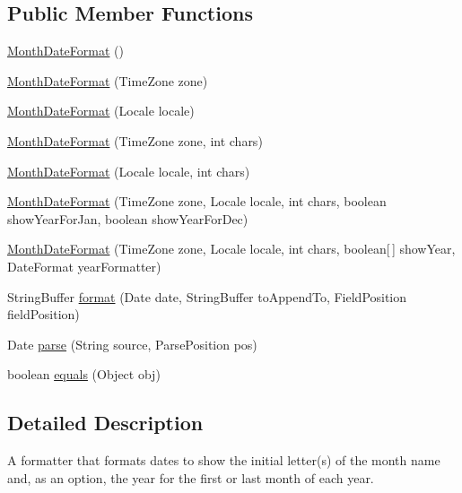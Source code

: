 \subsection*{Public Member Functions}
\begin{DoxyCompactItemize}
\item 
\mbox{\hyperlink{classorg_1_1jfree_1_1chart_1_1axis_1_1_month_date_format_a8b6826e19fa9d3f293747d8e635b74a7}{Month\+Date\+Format}} ()
\item 
\mbox{\hyperlink{classorg_1_1jfree_1_1chart_1_1axis_1_1_month_date_format_a57589918cf5331a7042e1eeefb56ae4a}{Month\+Date\+Format}} (Time\+Zone zone)
\item 
\mbox{\hyperlink{classorg_1_1jfree_1_1chart_1_1axis_1_1_month_date_format_a9046b5f0939b3254cfa15be25836b410}{Month\+Date\+Format}} (Locale locale)
\item 
\mbox{\hyperlink{classorg_1_1jfree_1_1chart_1_1axis_1_1_month_date_format_a949c3a15485bff918c0799a1bd0f540b}{Month\+Date\+Format}} (Time\+Zone zone, int chars)
\item 
\mbox{\hyperlink{classorg_1_1jfree_1_1chart_1_1axis_1_1_month_date_format_a83ee78aaeb24a76793268c5a6142a6d7}{Month\+Date\+Format}} (Locale locale, int chars)
\item 
\mbox{\hyperlink{classorg_1_1jfree_1_1chart_1_1axis_1_1_month_date_format_af58ea4c893ab9d48426c15666c09722d}{Month\+Date\+Format}} (Time\+Zone zone, Locale locale, int chars, boolean show\+Year\+For\+Jan, boolean show\+Year\+For\+Dec)
\item 
\mbox{\hyperlink{classorg_1_1jfree_1_1chart_1_1axis_1_1_month_date_format_a705e877375be07717cdfc22dea225a99}{Month\+Date\+Format}} (Time\+Zone zone, Locale locale, int chars, boolean\mbox{[}$\,$\mbox{]} show\+Year, Date\+Format year\+Formatter)
\item 
String\+Buffer \mbox{\hyperlink{classorg_1_1jfree_1_1chart_1_1axis_1_1_month_date_format_a74197ac0a76d197f26da1414f386260a}{format}} (Date date, String\+Buffer to\+Append\+To, Field\+Position field\+Position)
\item 
Date \mbox{\hyperlink{classorg_1_1jfree_1_1chart_1_1axis_1_1_month_date_format_a25d1114e933d424ace52b908039d20f4}{parse}} (String source, Parse\+Position pos)
\item 
boolean \mbox{\hyperlink{classorg_1_1jfree_1_1chart_1_1axis_1_1_month_date_format_a64f2b8f6192d107c8d222e16aa913f31}{equals}} (Object obj)
\end{DoxyCompactItemize}


\subsection{Detailed Description}
A formatter that formats dates to show the initial letter(s) of the month name and, as an option, the year for the first or last month of each year. 

